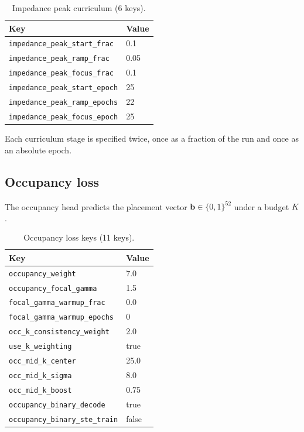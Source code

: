 \begin{table}[htbp]
\centering
\caption{Impedance peak curriculum (6 keys).}
\label{tab:appb_imp_curriculum}
\begin{tabular}{@{}ll@{}}
\hline
Key & Value \\
\hline
\texttt{impedance\_peak\_start\_frac} & 0.1 \\
\texttt{impedance\_peak\_ramp\_frac} & 0.05 \\
\texttt{impedance\_peak\_focus\_frac} & 0.1 \\
\texttt{impedance\_peak\_start\_epoch} & 25 \\
\texttt{impedance\_peak\_ramp\_epochs} & 22 \\
\texttt{impedance\_peak\_focus\_epoch} & 25 \\
\hline
\end{tabular}
\end{table}

Each curriculum stage is specified twice, once as a fraction of the run and once as an
absolute epoch.

\subsection{Occupancy loss}
\label{subsec:appb_occupancy_loss}

The occupancy head predicts the placement vector $\mathbf{b} \in \{0,1\}^{52}$ under a
budget $K$.

\begin{table}[htbp]
\centering
\caption{Occupancy loss keys (11 keys).}
\label{tab:appb_occupancy}
\begin{tabular}{@{}ll@{}}
\hline
Key & Value \\
\hline
\texttt{occupancy\_weight} & 7.0 \\
\texttt{occupancy\_focal\_gamma} & 1.5 \\
\texttt{focal\_gamma\_warmup\_frac} & 0.0 \\
\texttt{focal\_gamma\_warmup\_epochs} & 0 \\
\texttt{occ\_k\_consistency\_weight} & 2.0 \\
\texttt{use\_k\_weighting} & true \\
\texttt{occ\_mid\_k\_center} & 25.0 \\
\texttt{occ\_mid\_k\_sigma} & 8.0 \\
\texttt{occ\_mid\_k\_boost} & 0.75 \\
\texttt{occupancy\_binary\_decode} & true \\
\texttt{occupancy\_binary\_ste\_train} & false \\
\hline
\end{tabular}
\end{table}

